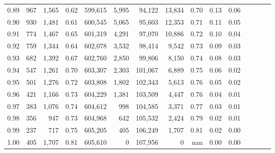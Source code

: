\begin{tabular}{rrrcrrrrrrrrrrr}
0.89 &     967 &  1,565 &                                       0.62 &  599,615 &    5,995 &   94,122 &   13,834 &  0.70 &  0.13 &                         0.06 \\
0.90 &     930 &  1,481 &                                       0.61 &  600,545 &    5,065 &   95,603 &   12,353 &  0.71 &  0.11 &                         0.05 \\
0.91 &     774 &  1,467 &                                       0.65 &  601,319 &    4,291 &   97,070 &   10,886 &  0.72 &  0.10 &                         0.04 \\
0.92 &     759 &  1,344 &                                       0.64 &  602,078 &    3,532 &   98,414 &    9,542 &  0.73 &  0.09 &                         0.03 \\
0.93 &     682 &  1,392 &                                       0.67 &  602,760 &    2,850 &   99,806 &    8,150 &  0.74 &  0.08 &                         0.03 \\
0.94 &     547 &  1,261 &                                       0.70 &  603,307 &    2,303 &  101,067 &    6,889 &  0.75 &  0.06 &                         0.02 \\
0.95 &     501 &  1,276 &                                       0.72 &  603,808 &    1,802 &  102,343 &    5,613 &  0.76 &  0.05 &                         0.02 \\
0.96 &     421 &  1,166 &                                       0.73 &  604,229 &    1,381 &  103,509 &    4,447 &  0.76 &  0.04 &                         0.01 \\
0.97 &     383 &  1,076 &                                       0.74 &  604,612 &      998 &  104,585 &    3,371 &  0.77 &  0.03 &                         0.01 \\
0.98 &     356 &    947 &                                       0.73 &  604,968 &      642 &  105,532 &    2,424 &  0.79 &  0.02 &                         0.01 \\
0.99 &     237 &    717 &                                       0.75 &  605,205 &      405 &  106,249 &    1,707 &  0.81 &  0.02 &                         0.00 \\
1.00 &     405 &  1,707 &                                       0.81 &  605,610 &        0 &  107,956 &        0 &   nan &  0.00 &                         0.00 \\
\bottomrule
\end{tabular}
